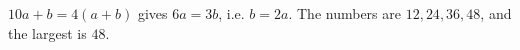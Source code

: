 $10a+b=4(a+b)$ gives $6a=3b$, i.e. $b=2a$. The numbers are $12,24,36,48$, and the largest is $\boxed{48}$.
